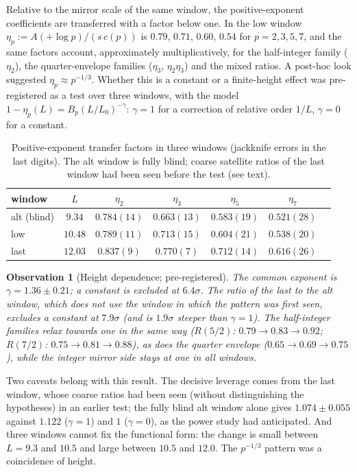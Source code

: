 \documentclass[12pt]{amsart}
\newtheorem{observation}{Observation}
\begin{document}
Relative to the mirror scale of the same window, the positive-exponent
coefficients are transferred with a factor below one. In the low window
$\eta_p := A(+\log p)/(s\,c(p))$ is $0.79$, $0.71$, $0.60$, $0.54$ for
$p = 2, 3, 5, 7$, and the same factors account, approximately
multiplicatively, for the half-integer family ($\eta_2$), the
quarter-envelope families ($\eta_3$, $\eta_2\eta_3$) and the mixed
ratios. A post-hoc look suggested $\eta_p \approx p^{-1/3}$. Whether this
is a constant or a finite-height effect was pre-registered as a test over
three windows, with the model $1 - \eta_p(L) = B_p (L/L_0)^{-\gamma}$:
$\gamma = 1$ for a correction of relative order $1/L$, $\gamma = 0$ for a
constant.

\begin{table}[h]
\centering
\begin{tabular}{lcccccc}
\toprule
window & $L$ & $\eta_2$ & $\eta_3$ & $\eta_5$ & $\eta_7$ \\
\midrule
alt (blind) & $9.34$ & $0.784(14)$ & $0.663(13)$ & $0.583(19)$ & $0.521(28)$\\
low & $10.48$ & $0.789(11)$ & $0.713(15)$ & $0.604(21)$ & $0.538(20)$\\
last & $12.03$ & $0.837(9)$ & $0.770(7)$ & $0.712(14)$ & $0.616(26)$\\
\bottomrule
\end{tabular}
\caption{\label{tab:kappa}Positive-exponent transfer factors in three
windows (jackknife errors in the last digits). The alt window is fully
blind; coarse satellite ratios of the last window had been seen before
the test (see text).}
\end{table}

\begin{observation}[Height dependence; pre-registered]\label{obs:height}
The common exponent is $\gamma = 1.36\pm0.21$; a constant is excluded at
$6.4\sigma$. The ratio of the last to the alt window, which does not use
the window in which the pattern was first seen, excludes a constant at
$7.9\sigma$ (and is $1.9\sigma$ steeper than $\gamma = 1$). The half-integer
families relax towards one in the same way ($R(5/2)$: $0.79\to0.83\to0.92$;
$R(7/2)$: $0.75\to0.81\to0.88$), as does the quarter envelope
($0.65\to0.69\to0.75$), while the integer mirror side stays at one in all
windows.
\end{observation}

Two caveats belong with this result. The decisive leverage comes from the
last window, whose coarse ratios had been seen (without distinguishing
the hypotheses) in an earlier test; the fully blind alt window alone gives
$1.074\pm0.055$ against $1.122$ ($\gamma=1$) and $1$ ($\gamma=0$), as the
power study had anticipated. And three windows cannot fix the functional
form: the change is small between $L = 9.3$ and $10.5$ and large between
$10.5$ and $12.0$. The $p^{-1/3}$ pattern was a coincidence of height.
\end{document}
